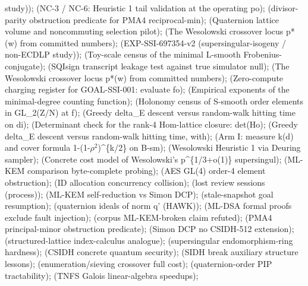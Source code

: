 study));  (NC-3 /\allowbreak{} NC-6: Heuristic 1 tail validation at the operating po);  (divisor-parity obstruction predicate for PMA4 reciprocal-min);  (Quaternion lattice volume and noncommuting selection pilot);  (The Wesolowski crossover locus p*(w) from committed numbers);  (EXP-SSI-697354-v2 (supersingular-isogeny /\allowbreak{} non-ECDLP study));  (Toy-scale census of the minimal L-smooth Frobenius-conjugate);  (SQIsign transcript leakage test against true simulator null);  (The Wesolowski crossover locus p*(w) from committed numbers);  (Zero-compute charging register for GOAL-SSI-001: evaluate fo);  (Empirical exponents of the minimal-degree counting function);  (Holonomy census of S-smooth order elements in GL\_\allowbreak{}2(Z/\allowbreak{}N) at f);  (Greedy delta\_\allowbreak{}E descent versus random-walk hitting time on di);  (Determinant check for the rank-4 Hom-lattice closure: det(Ho);  (Greedy delta\_\allowbreak{}E descent versus random-walk hitting time, with);  (Arm I: measure k(d) and cover formula 1-(1-$\rho$$^2$)\textasciicircum{}\{k/\allowbreak{}2\} on B-sm);  (Wesolowski Heuristic 1 via Deuring sampler);  (Concrete cost model of Wesolowski's p\textasciicircum{}\{1/\allowbreak{}3+o(1)\} supersingul);  (ML-KEM comparison byte-complete probing);  (AES GL(4) order-4 element obstruction);  (ID allocation concurrency collision);  (lost review sessions (process));  (ML-KEM self-reduction vs Simon DCP);  (stale-snapshot goal resumption);  (quaternion ideals of norm q' (HAWK));  (ML-DSA formal proofs exclude fault injection);  (corpus ML-KEM-broken claim refuted);  (PMA4 principal-minor obstruction predicate);  (Simon DCP no CSIDH-512 extension);  (structured-lattice index-calculus analogue);  (supersingular endomorphism-ring hardness);  (CSIDH concrete quantum security);  (SIDH break auxiliary structure lessons);  (enumeration/\allowbreak{}sieving crossover full cost);  (quaternion-order PIP tractability);  (TNFS Galois linear-algebra speedups); 